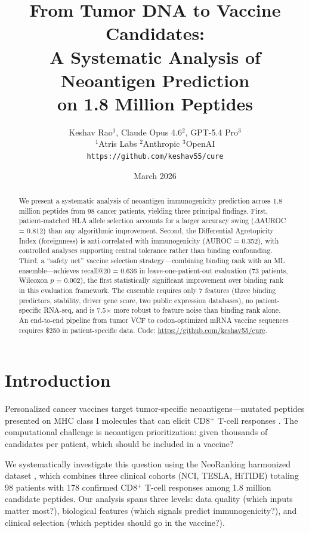 \documentclass[11pt,twocolumn]{article}
\title{\textbf{From Tumor DNA to Vaccine Candidates:\\A Systematic Analysis of Neoantigen Prediction\\on 1.8 Million Peptides}}
\author{Keshav Rao$^{1}$, Claude Opus 4.6$^{2}$, GPT-5.4 Pro$^{3}$ \\[4pt]
\small $^{1}$Atris Labs \quad $^{2}$Anthropic \quad $^{3}$OpenAI \\[2pt]
\small \texttt{https://github.com/keshav55/cure}}
\date{March 2026}
\begin{document}
\maketitle

\begin{abstract}
We present a systematic analysis of neoantigen immunogenicity prediction across 1.8 million peptides from 98 cancer patients, yielding three principal findings. First, patient-matched HLA allele selection accounts for a larger accuracy swing ($\Delta$AUROC = 0.812) than any algorithmic improvement. Second, the Differential Agretopicity Index (foreignness) is anti-correlated with immunogenicity (AUROC = 0.352), with controlled analyses supporting central tolerance rather than binding confounding. Third, a ``safety net'' vaccine selection strategy---combining binding rank with an ML ensemble---achieves recall@20 = 0.636 in leave-one-patient-out evaluation (73 patients, Wilcoxon $p$ = 0.002), the first statistically significant improvement over binding rank in this evaluation framework. The ensemble requires only 7 features (three binding predictors, stability, driver gene score, two public expression databases), no patient-specific RNA-seq, and is 7.5$\times$ more robust to feature noise than binding rank alone. An end-to-end pipeline from tumor VCF to codon-optimized mRNA vaccine sequences requires \$250 in patient-specific data. Code: \url{https://github.com/keshav55/cure}.
\end{abstract}

\section{Introduction}

Personalized cancer vaccines target tumor-specific neoantigens---mutated peptides presented on MHC class I molecules that can elicit CD8$^{+}$ T-cell responses \cite{ott2017, carreno2015}. The computational challenge is neoantigen prioritization: given thousands of candidates per patient, which should be included in a vaccine?

We systematically investigate this question using the NeoRanking harmonized dataset \cite{muller2023neoranking}, which combines three clinical cohorts (NCI, TESLA, HiTIDE) totaling 98 patients with 178 confirmed CD8$^{+}$ T-cell responses among 1.8 million candidate peptides. Our analysis spans three levels: data quality (which inputs matter most?), biological features (which signals predict immunogenicity?), and clinical selection (which peptides should go in the vaccine?).
\end{document}
